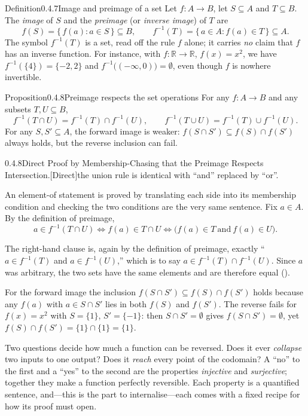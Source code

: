 \documentclass[main.tex]{subfiles}
\begin{document}
\begin{Obj}{Definition}{0.4.7}{Image and preimage of a set}
Let $f\colon A\to B$, let $S\subseteq A$ and $T\subseteq B$. The \emph{image} of $S$ and the
\emph{preimage} (or \emph{inverse image}) of $T$ are
\[
f(S)=\{\,f(a) : a\in S\,\}\subseteq B,
\qquad
f^{-1}(T)=\{\,a\in A : f(a)\in T\,\}\subseteq A.
\]
The symbol $f^{-1}(T)$ is a set, read off the rule $f$ alone; it carries \emph{no} claim that $f$ has
an inverse function. For instance, with $f\colon\mathbb R\to\mathbb R$, $f(x)=x^2$, we have
$f^{-1}(\{4\})=\{-2,2\}$ and $f^{-1}\bigl((-\infty,0)\bigr)=\emptyset$, even though $f$ is nowhere
invertible.
\end{Obj}

\begin{Obj}{Proposition}{0.4.8}{Preimage respects the set operations}
For any $f\colon A\to B$ and any subsets $T,U\subseteq B$,
\[
f^{-1}(T\cap U)=f^{-1}(T)\cap f^{-1}(U),
\qquad
f^{-1}(T\cup U)=f^{-1}(T)\cup f^{-1}(U).
\]
For any $S,S'\subseteq A$, the forward image is weaker: $f(S\cap S')\subseteq f(S)\cap f(S')$ always
holds, but the reverse inclusion can fail.
\end{Obj}

\begin{Prf}{0.4.8}{Direct Proof by Membership-Chasing that the Preimage Respects Intersection.}{[Direct]\quad the union rule is identical with ``and'' replaced by ``or''.}
\item An element-of statement is proved by translating each side into its membership condition and
checking the two conditions are the very same sentence. Fix $a\in A$. By the definition of preimage,
\[
a\in f^{-1}(T\cap U)
\iff f(a)\in T\cap U
\iff \bigl(f(a)\in T\ \text{and}\ f(a)\in U\bigr).
\]
\item The right-hand clause is, again by the definition of preimage, exactly ``$a\in f^{-1}(T)$ and
$a\in f^{-1}(U)$,'' which is to say $a\in f^{-1}(T)\cap f^{-1}(U)$. Since $a$ was arbitrary, the two
sets have the same elements and are therefore equal ().
\item For the forward image the inclusion $f(S\cap S')\subseteq f(S)\cap f(S')$ holds because any
$f(a)$ with $a\in S\cap S'$ lies in both $f(S)$ and $f(S')$. The reverse fails for $f(x)=x^2$ with
$S=\{1\}$, $S'=\{-1\}$: then $S\cap S'=\emptyset$ gives $f(S\cap S')=\emptyset$, yet
$f(S)\cap f(S')=\{1\}\cap\{1\}=\{1\}$.
\end{Prf}

\noindent Two questions decide how much a function can be reversed. Does it ever \emph{collapse} two
inputs to one output? Does it \emph{reach} every point of the codomain? A ``no'' to the first and a
``yes'' to the second are the properties \emph{injective} and \emph{surjective}; together they make a
function perfectly reversible. Each property is a quantified sentence, and---this is the part to
internalise---each comes with a fixed recipe for how its proof must open.
\end{document}
